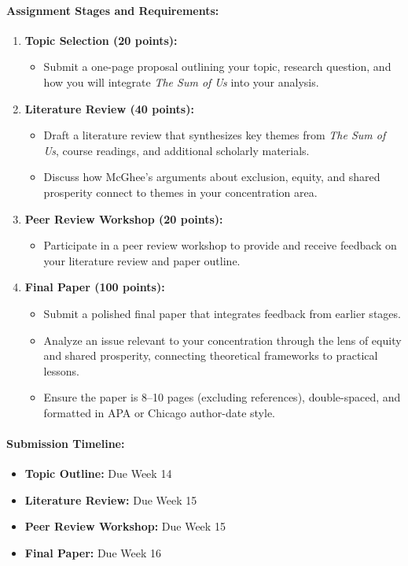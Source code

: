 \documentclass[11pt]{article}     %
\begin{document}
\paragraph*{Assignment Stages and Requirements:}
\begin{enumerate}
    \item \textbf{Topic Selection (20 points):}
    \begin{itemize}
        \item Submit a one-page proposal outlining your topic, research question, and how you will integrate \textit{The Sum of Us} into your analysis.
    \end{itemize}
    \item \textbf{Literature Review (40 points):}
    \begin{itemize}
        \item Draft a literature review that synthesizes key themes from \textit{The Sum of Us}, course readings, and additional scholarly materials.
        \item Discuss how McGhee's arguments about exclusion, equity, and shared prosperity connect to themes in your concentration area.
    \end{itemize}
    \item \textbf{Peer Review Workshop (20 points):}
    \begin{itemize}
        \item Participate in a peer review workshop to provide and receive feedback on your literature review and paper outline.
    \end{itemize}
    \item \textbf{Final Paper (100 points):}
    \begin{itemize}
        \item Submit a polished final paper that integrates feedback from earlier stages.
        \item Analyze an issue relevant to your concentration through the lens of equity and shared prosperity, connecting theoretical frameworks to practical lessons.
        \item Ensure the paper is 8--10 pages (excluding references), double-spaced, and formatted in APA or Chicago author-date style.
    \end{itemize}
\end{enumerate}

\paragraph*{Submission Timeline:}
\begin{itemize}
    \item \textbf{Topic Outline:} Due Week 14
    \item \textbf{Literature Review:} Due Week 15
    \item \textbf{Peer Review Workshop:} Due Week 15
    \item \textbf{Final Paper:} Due Week 16
\end{itemize}
\end{document}
